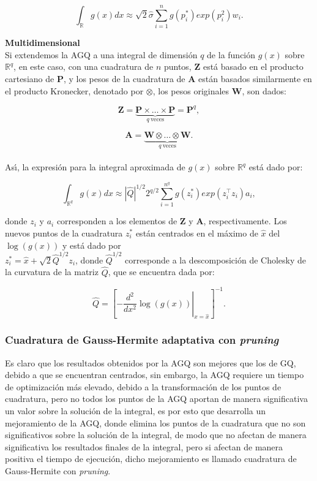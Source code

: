 \[
\int_{\mathbb{R}}{g(x)dx}\approx\sqrt{2}\hat{\sigma}\sum_{i=1}^{n}{g(p_i^*)exp(p_i^2)w_i.}
\]

\textbf{Multidimensional\\}
Si extendemos la AGQ a una integral de dimensi\'{o}n $q$ de la funci\'{o}n $g(x)$ sobre $\mathbb{R}^q$, en este caso, con una cuadratura de $n$ puntos, $\textbf{Z}$ est\'{a} basado en el producto cartesiano de $\textbf{P}$, y los pesos de la cuadratura de $\textbf{A}$ est\'{a}n basados similarmente en el producto Kronecker, denotado por $\otimes$, los pesos originales $\textbf{W}$, son dados:

\[
\textbf{Z}=\underbrace{\textbf{P} \times \ldots \times \textbf{P}}_{q\ \text{veces}}=\textbf{P}^q,
\]

\[
\textbf{A}=\underbrace{\textbf{W} \otimes \ldots \otimes \textbf{W}}_{q\ \text{veces}}.
\]
\\
As\'{\i}, la expresi\'{o}n para la integral aproximada de $g(x)$ sobre $\mathbb{R}^q$ est\'{a} dado por:

\begin{equation}
\int_{\mathbb{R}^q}{g(x)dx}\approx|\hat{Q}|^{1/2} 2^{q/2}\sum_{i=1}^{n^q}g(z_i^*)exp(z_i^{\top}z_i)a_i,
\label{EQ_ghmulti}
\end{equation}

donde $z_i$ y $a_i$ corresponden a los elementos de $\textbf{Z}$ y $\textbf{A}$, respectivamente. Los nuevos puntos de la cuadratura $z_i^*$ est\'{a}n centrados en el m\'{a}ximo de $\hat{x}$ del $\log(g(x))$ y est\'{a} dado por \\
$z_i^*=\hat{x}+\sqrt{2}\hat{Q}^{1/2}z_i$, donde $\hat{Q}^{1/2}$ corresponde a la descomposici\'{o}n de Cholesky de la curvatura de la matriz $\hat{Q}$, que se encuentra dada por:

\[
\hat{Q}={\left[\left. -\frac{d^2}{dx^2}\log(g(x))\right|_{x=\hat{x}}\right]^{-1}}.
\]

\subsubsection{Cuadratura de Gauss-Hermite adaptativa con \textit{pruning}}

Es claro que los resultados obtenidos por la AGQ son mejores que los de GQ, debido a que se encuentran centrados, sin embargo, la AGQ requiere un tiempo de optimizaci\'{o}n m\'{a}s elevado, debido a la transformaci\'{o}n de los puntos de cuadratura, pero no todos los puntos de la AGQ aportan de manera significativa un valor sobre la soluci\'{o}n de la integral, es por esto que \cite{Hernandez1} desarrolla un mejoramiento de la AGQ, donde elimina los puntos de la cuadratura que no son significativos sobre la soluci\'{o}n de la integral, de modo que no afectan de manera significativa los resultados finales de la integral, pero si afectan de manera positiva el tiempo de ejecuci\'{o}n, dicho mejoramiento es llamado cuadratura de Gauss-Hermite con \textit{pruning}.\\

